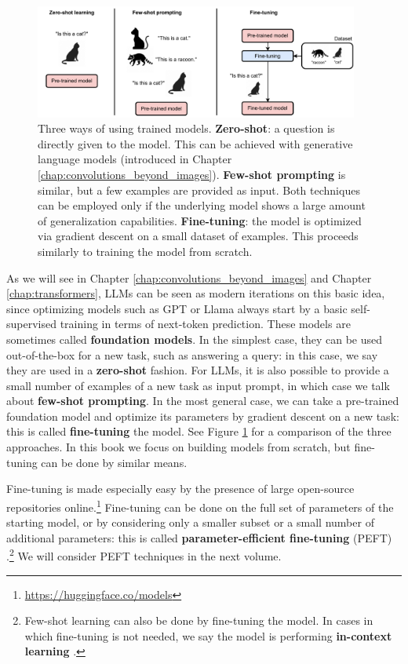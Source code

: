 \begin{figure}[t]
    \centering
    \includegraphics[width=0.95\textwidth]{images/using_models.pdf}
    \caption{Three ways of using trained models. \textbf{Zero-shot}: a question is directly given to the model. This can be achieved with generative language models (introduced in Chapter \ref{chap:convolutions_beyond_images}). \textbf{Few-shot prompting} is similar, but a few examples are provided as input. Both techniques can be employed only if the underlying model shows a large amount of generalization capabilities. \textbf{Fine-tuning}: the model is optimized via gradient descent on a small dataset of examples. This proceeds similarly to training the model from scratch.}
    \label{fig:using_models}
\end{figure}

As we will see in Chapter \ref{chap:convolutions_beyond_images} and Chapter \ref{chap:transformers}, LLMs can be seen as modern iterations on this basic idea, since optimizing models such as GPT or Llama \cite{touvron2023llama} always start by a basic self-supervised training in terms of next-token prediction. These models are sometimes called \textbf{foundation models}. In the simplest case, they can be used out-of-the-box for a new task, such as answering a query: in this case, we say they are used in a \textbf{zero-shot} fashion. For LLMs, it is also possible to provide a small number of examples of a new task as input prompt, in which case we talk about \textbf{few-shot prompting}. In the most general case, we can take a pre-trained foundation model and optimize its parameters by gradient descent on a new task: this is called \textbf{fine-tuning} the model. See Figure \ref{fig:using_models} for a comparison of the three approaches. In this book we focus on building models from scratch, but fine-tuning can be done by similar means.

Fine-tuning is made especially easy by the presence of large open-source repositories online.\footnote{\url{https://huggingface.co/models}} Fine-tuning can be done on the full set of parameters of the starting model, or by considering only a smaller subset or a small number of additional parameters: this is called \textbf{parameter-efficient fine-tuning} (PEFT) \cite{lialin2023scaling}.\footnote{Few-shot learning can also be done by fine-tuning the model. In cases in which fine-tuning is not needed, we say the model is performing \textbf{in-context learning} \cite{akyurek2022learning}.} We will consider PEFT techniques in the next volume.

